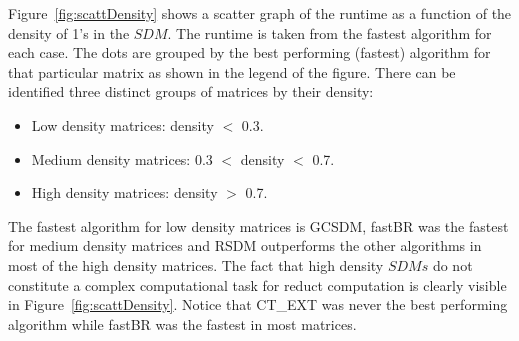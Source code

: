 \documentclass[authoryear,11pt]{elsarticle}
\begin{document}
	Figure~\ref{fig:scattDensity} shows a scatter graph of the runtime as a function of 
	the density of 1's in the $SDM$. The runtime is taken from the fastest algorithm for 
	each case. The dots are grouped by the best performing (fastest)	algorithm for that particular 
	matrix as shown in the legend of the figure. There can be identified three distinct groups of 
	matrices by their density:
	\begin{itemize}
	\item Low density matrices: density $<$ 0.3.
	\item Medium density matrices: 0.3 $<$ density $<$ 0.7.
	\item High density matrices: density $>$ 0.7.
	\end{itemize}
	The fastest algorithm for low density matrices is GCSDM, fastBR was the fastest for
	medium density matrices and RSDM outperforms the other algorithms in most of the high
	density matrices. The fact that high density $SDMs$ do not constitute a complex computational
	task for reduct computation is clearly visible in Figure~\ref{fig:scattDensity}. Notice that
	CT\_EXT was never the best performing algorithm while fastBR was the fastest in most matrices.
		
\end{document}
